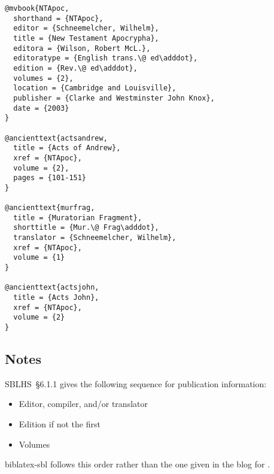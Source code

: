 \documentclass[a4paper]{article}
\newcommand*{\pkg}[1]{\textsf{#1}}
\renewcommand\footnote[1]{##1}%
\begin{document}
\begin{verbatim}
@mvbook{NTApoc,
  shorthand = {NTApoc},
  editor = {Schneemelcher, Wilhelm},
  title = {New Testament Apocrypha},
  editora = {Wilson, Robert McL.},
  editoratype = {English trans.\@ ed\adddot},
  edition = {Rev.\@ ed\adddot},
  volumes = {2},
  location = {Cambridge and Louisville},
  publisher = {Clarke and Westminster John Knox},
  date = {2003}
}

@ancienttext{actsandrew,
  title = {Acts of Andrew},
  xref = {NTApoc},
  volume = {2},
  pages = {101-151}
}

@ancienttext{murfrag,
  title = {Muratorian Fragment},
  shorttitle = {Mur.\@ Frag\adddot},
  translator = {Schneemelcher, Wilhelm},
  xref = {NTApoc},
  volume = {1}
}

@ancienttext{actsjohn,
  title = {Acts John},
  xref = {NTApoc},
  volume = {2}
}
\end{verbatim}

\begin{fverbcite}{22}
  \autocite[For Lycomedes’s lament over his wife Cleopatra’s paralysis,
  see][(20)173]{actsjohn}
\end{fverbcite}
\exampleancientsources
\examplesecondarysources


\subsection{Notes}

SBLHS~§6.1.1 gives the following sequence for publication information:
\begin{itemize}
  \item Editor, compiler, and/or translator
  \item Edition if not the first
  \item Volumes
\end{itemize}
\pkg{biblatex-sbl} follows this order rather than the one given in the blog
for \cite{NTApoc}.
\end{document}
